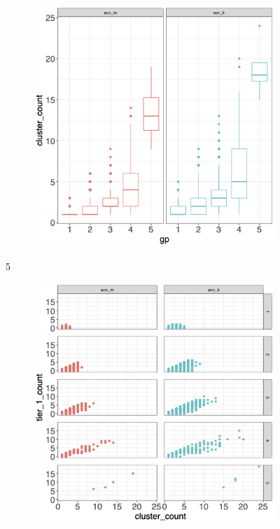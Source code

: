 \documentclass[12pt, oneside]{article}   	%
\begin{document}
	\begin{figure}[H]
		\centering
		\begin{subfigure}[t]{0.48\textwidth}
			\centering
			\includegraphics[width=\linewidth]{cluster_group.png} 
		\end{subfigure}5
		\hfill
		\begin{subfigure}[t]{0.48\textwidth}
			\centering
			\includegraphics[width=\linewidth]{tier_cluster.png} 

\end{subfigure}
\end{figure}
\end{document}
